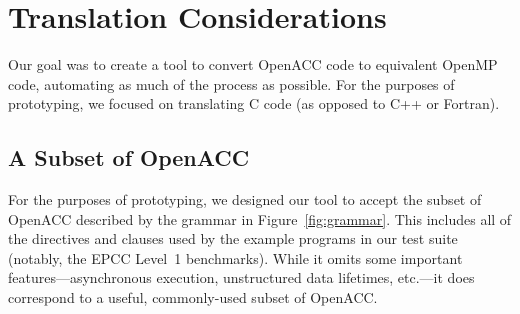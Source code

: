 \documentclass{sig-alternate-05-2015}
\begin{document}
\section{Translation Considerations}
\label{sec:translation}


Our goal was to create a tool to convert OpenACC code to equivalent OpenMP
code, automating as much of the process as possible.  For the purposes of
prototyping, we focused on translating C code (as opposed to C++ or Fortran).

\subsection{A Subset of OpenACC}
For the purposes of prototyping, we designed our tool to accept the subset of
OpenACC described by the grammar in Figure~\ref{fig:grammar}.  This includes
all of the directives and clauses used by the example programs in our test
suite (notably, the EPCC Level~1 benchmarks).  While it omits some important
features---asynchronous execution, unstructured data lifetimes, etc.---it does
correspond to a useful, commonly-used subset of OpenACC.
\end{document}
